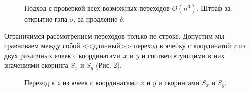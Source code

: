 \documentclass[letterpaper, 11pt]{article}
\begin{document}
\begin{figure}[H]
  \caption{Подход с проверкой всех возможных переходов $O(n^3)$. Штраф за открытие гэпа $\sigma$, за продление $\delta$.}
\end{figure}

Ограничимся рассмотрением переходов только по строке. Допустим мы сравниваем между собой <<длинный>> переход в ячейку с координатой $z$ из двух различных ячеек с координатами $x$ и $y$ и соответсвтующими в них значениями скоринга $S_x$ и $S_y$ (Рис. 2).

\begin{figure}[H]
  \caption{Переход в $z$ из ячеек с координатами $x$ и $y$ и скорингами $S_x$ и $S_y$.}
\end{figure}
\end{document}
